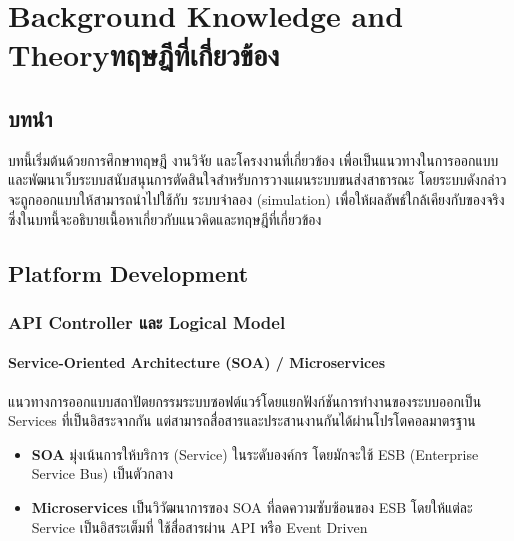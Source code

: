 \chapter{\ifenglish Background Knowledge and Theory\else ทฤษฎีที่เกี่ยวข้อง\fi}

\section{บทนำ}
  \sloppy\indent บทนี้เริ่มต้นด้วยการศึกษาทฤษฎี งานวิจัย และโครงงานที่เกี่ยวข้อง 
เพื่อเป็นแนวทางในการออกแบบและพัฒนาเว็บระบบสนับสนุนการตัดสินใจสำหรับการวางแผนระบบขนส่งสาธารณะ
โดยระบบดังกล่าวจะถูกออกแบบให้สามารถนำไปใช้กับ ระบบจำลอง (simulation) เพื่อให้ผลลัพธ์ใกล้เคียงกับของจริง
ซึ่งในบทนี้จะอธิบายเนื้อหาเกี่ยวกับแนวคิดและทฤษฎีที่เกี่ยวข้อง

\section{Platform Development}
\subsection{API Controller และ Logical Model}
\subsubsection{Service-Oriented Architecture (SOA) / Microservices}
\indent แนวทางการออกแบบสถาปัตยกรรมระบบซอฟต์แวร์โดยแยกฟังก์ชันการทำงานของระบบออกเป็น 
Services ที่เป็นอิสระจากกัน แต่สามารถสื่อสารและประสานงานกันได้ผ่านโปรโตคอลมาตรฐาน

\begin{itemize}
    \item \textbf{SOA} มุ่งเน้นการให้บริการ (Service) ในระดับองค์กร โดยมักจะใช้ ESB (Enterprise Service Bus) เป็นตัวกลาง
    \item \textbf{Microservices} เป็นวิวัฒนาการของ SOA ที่ลดความซับซ้อนของ ESB โดยให้แต่ละ Service เป็นอิสระเต็มที่ ใช้สื่อสารผ่าน API หรือ Event Driven
\end{itemize}

\begin{center}
\end{center}

